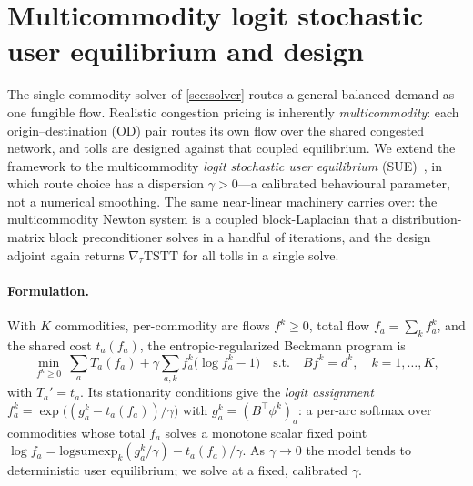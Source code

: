 \documentclass[ijoc]{informs3}
\begin{document}
\section{Multicommodity logit stochastic user equilibrium and design}\label{sec:mc}
The single-commodity solver of \cref{sec:solver} routes a general balanced demand as one fungible flow.
Realistic congestion pricing is inherently \emph{multicommodity}: each origin--destination (OD) pair routes its
own flow over the shared congested network, and tolls are designed against that coupled equilibrium. We extend
the framework to the multicommodity \emph{logit stochastic user equilibrium} (SUE)~\citep{fisk1980,daganzo1977},
in which route choice has a dispersion $\gamma>0$---a calibrated behavioural parameter, not a numerical
smoothing. The same near-linear machinery carries over: the multicommodity Newton system is a coupled
block-Laplacian that a distribution-matrix block preconditioner solves in a handful of iterations, and the design
adjoint again returns $\nabla_\tau\mathrm{TSTT}$ for all tolls in a single solve.

\paragraph{Formulation.}
With $K$ commodities, per-commodity arc flows $f^k\ge0$, total flow $f_a=\sum_k f^k_a$, and the shared cost
$t_a(f_a)$, the entropic-regularized Beckmann program is
\begin{equation}\label{eq:mcbeck}
  \min_{f^k\ge0}\ \sum_a T_a(f_a)+\gamma\sum_{a,k}f^k_a\bigl(\log f^k_a-1\bigr)
  \quad\text{s.t.}\quad B f^k=d^k,\quad k=1,\dots,K,
\end{equation}
with $T_a'=t_a$. Its stationarity conditions give the \emph{logit assignment}
$f^k_a=\exp\!\bigl((g^k_a-t_a(f_a))/\gamma\bigr)$ with $g^k_a=(B^\top\phi^k)_a$: a per-arc softmax over commodities
whose total $f_a$ solves a monotone scalar fixed point $\log f_a=\mathrm{logsumexp}_k(g^k_a/\gamma)-t_a(f_a)/\gamma$.
As $\gamma\to0$ the model tends to deterministic user equilibrium; we solve at a fixed, calibrated $\gamma$.
\end{document}

